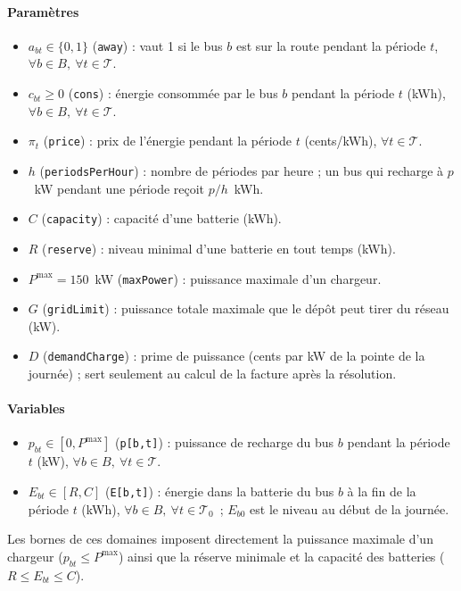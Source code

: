 \documentclass{article}
\begin{document}
\paragraph{Paramètres}
\begin{itemize}
  \item $a_{bt} \in \{0,1\}$ (\texttt{away}) : vaut 1 si le bus $b$ est sur la route pendant la période $t$, $\forall b \in B,\ \forall t \in \mathcal{T}$.
  \item $c_{bt} \geq 0$ (\texttt{cons}) : énergie consommée par le bus $b$ pendant la période $t$ (kWh), $\forall b \in B,\ \forall t \in \mathcal{T}$.
  \item $\pi_t$ (\texttt{price}) : prix de l'énergie pendant la période $t$ (cents/kWh), $\forall t \in \mathcal{T}$.
  \item $h$ (\texttt{periodsPerHour}) : nombre de périodes par heure ; un bus qui recharge à $p$~kW pendant une période reçoit $p/h$~kWh.
  \item $C$ (\texttt{capacity}) : capacité d'une batterie (kWh).
  \item $R$ (\texttt{reserve}) : niveau minimal d'une batterie en tout temps (kWh).
  \item $P^{\max} = 150$~kW (\texttt{maxPower}) : puissance maximale d'un chargeur.
  \item $G$ (\texttt{gridLimit}) : puissance totale maximale que le dépôt peut tirer du réseau (kW).
  \item $D$ (\texttt{demandCharge}) : prime de puissance (cents par kW de la pointe de la journée) ; sert seulement au calcul de la facture après la résolution.
\end{itemize}

\paragraph{Variables}
\begin{itemize}
  \item $p_{bt} \in [0, P^{\max}]$ (\texttt{p[b,t]}) : puissance de recharge du bus $b$ pendant la période $t$ (kW), $\forall b \in B,\ \forall t \in \mathcal{T}$.
  \item $E_{bt} \in [R, C]$ (\texttt{E[b,t]}) : énergie dans la batterie du bus $b$ à la fin de la période $t$ (kWh), $\forall b \in B,\ \forall t \in \mathcal{T}_0$~; $E_{b0}$ est le niveau au début de la journée.
\end{itemize}
Les bornes de ces domaines imposent directement la puissance maximale d'un chargeur ($p_{bt} \leq P^{\max}$) ainsi que la réserve minimale et la capacité des batteries ($R \leq E_{bt} \leq C$).
\end{document}
